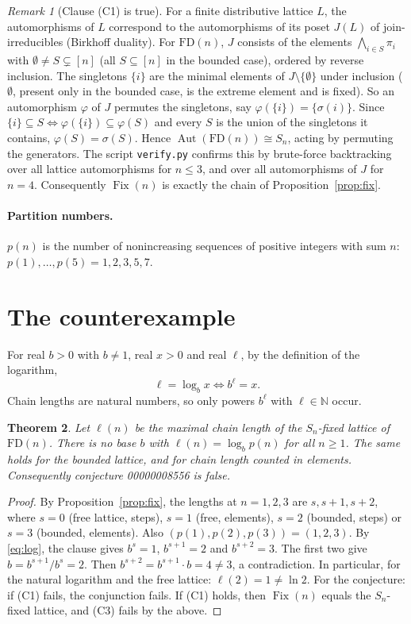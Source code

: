 \documentclass[11pt]{article}
\newtheorem{theorem}{Theorem}
\theoremstyle{definition}
\theoremstyle{remark}
\newtheorem{remark}[theorem]{Remark}
\newcommand{\FD}{\mathrm{FD}}
\newcommand{\Aut}{\operatorname{Aut}}
\newcommand{\Fix}{\operatorname{Fix}}
\newcommand{\N}{\mathbb{N}}
\begin{document}
\begin{remark}[Clause (C1) is true]\label{rem:aut}
For a finite distributive lattice $L$, the automorphisms of $L$ correspond to the
automorphisms of its poset $J(L)$ of join-irreducibles (Birkhoff duality). For
$\FD(n)$, $J$ consists of the elements $\bigwedge_{i\in S}\pi_i$ with
$\emptyset\ne S\subsetneq[n]$ (all $S\subseteq[n]$ in the bounded case), ordered
by reverse inclusion. The singletons $\{i\}$ are the minimal elements of
$J\setminus\{\emptyset\}$ under inclusion ($\emptyset$, present only in the
bounded case, is the extreme element and is fixed). So an automorphism $\varphi$
of $J$ permutes the singletons, say $\varphi(\{i\})=\{\sigma(i)\}$. Since
$\{i\}\subseteq S\iff\varphi(\{i\})\subseteq\varphi(S)$ and every $S$ is the union
of the singletons it contains, $\varphi(S)=\sigma(S)$.
Hence
$\Aut(\FD(n))\cong S_n$, acting by permuting the generators. The script
\texttt{verify.py} confirms this by brute-force backtracking over all lattice
automorphisms for $n\le3$, and over all automorphisms of $J$ for $n=4$.
Consequently $\Fix(n)$ is exactly the chain of Proposition~\ref{prop:fix}.
\end{remark}

\paragraph{Partition numbers.} $p(n)$ is the number of nonincreasing sequences of
positive integers with sum $n$: $p(1),\dots,p(5)=1,2,3,5,7$.

\section{The counterexample}
For real $b>0$ with $b\ne1$, real $x>0$ and real $\ell$, by the definition of the
logarithm,
\begin{equation}\label{eq:log}
\ell=\log_b x\iff b^\ell=x .
\end{equation}
Chain lengths are natural numbers, so only powers $b^\ell$ with $\ell\in\N$
occur.

\begin{theorem}\label{thm:main}
Let $\ell(n)$ be the maximal chain length of the $S_n$-fixed lattice of $\FD(n)$.
There is no base $b$ with $\ell(n)=\log_b p(n)$ for all $n\ge1$. The same holds
for the bounded lattice, and for chain length counted in elements. Consequently
conjecture 00000008556 is false.
\end{theorem}
\begin{proof}
By Proposition~\ref{prop:fix}, the lengths at $n=1,2,3$ are $s,s+1,s+2$, where
$s=0$ (free lattice, steps), $s=1$ (free, elements), $s=2$ (bounded, steps) or
$s=3$ (bounded, elements). Also $(p(1),p(2),p(3))=(1,2,3)$. By \eqref{eq:log},
the clause gives $b^s=1$, $b^{s+1}=2$ and $b^{s+2}=3$. The first two give
$b=b^{s+1}/b^s=2$. Then $b^{s+2}=b^{s+1}\cdot b=4\ne3$, a contradiction.
In particular, for the natural logarithm and the free lattice: $\ell(2)=1\ne\ln 2$.
For the conjecture: if (C1) fails, the conjunction fails. If (C1) holds, then
$\Fix(n)$ equals the $S_n$-fixed lattice, and (C3) fails by the above.
\end{proof}
\end{document}
